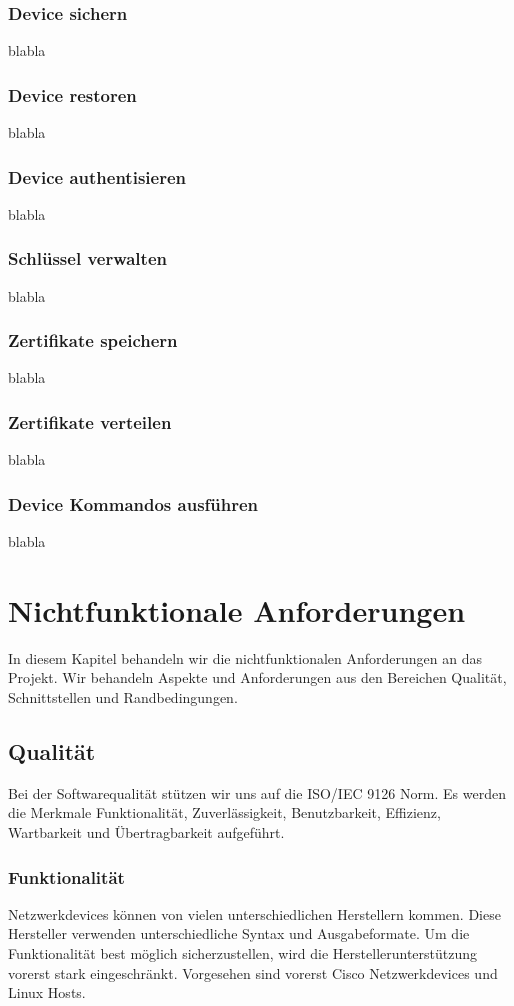 \subsubsection{Device sichern}
blabla
\subsubsection{Device restoren}
blabla
\subsubsection{Device authentisieren}
blabla
\subsubsection{Schlüssel verwalten}
blabla
\subsubsection{Zertifikate speichern}
blabla
\subsubsection{Zertifikate verteilen}
blabla
\subsubsection{Device Kommandos ausführen}
blabla

\section{Nichtfunktionale Anforderungen}
In diesem Kapitel behandeln wir die nichtfunktionalen Anforderungen an das Projekt. Wir behandeln Aspekte und Anforderungen aus den Bereichen Qualität, Schnittstellen und Randbedingungen.
\subsection{Qualität}
Bei der Softwarequalität stützen wir uns auf die ISO/IEC 9126 Norm. Es werden die Merkmale Funktionalität, Zuverlässigkeit, Benutzbarkeit, Effizienz, Wartbarkeit und Übertragbarkeit aufgeführt.
\subsubsection{Funktionalität}
Netzwerkdevices können von vielen unterschiedlichen Herstellern kommen. Diese Hersteller verwenden unterschiedliche Syntax und Ausgabeformate. Um die Funktionalität best möglich sicherzustellen, wird die Herstellerunterstützung vorerst stark eingeschränkt. Vorgesehen sind vorerst Cisco Netzwerkdevices und Linux Hosts.
